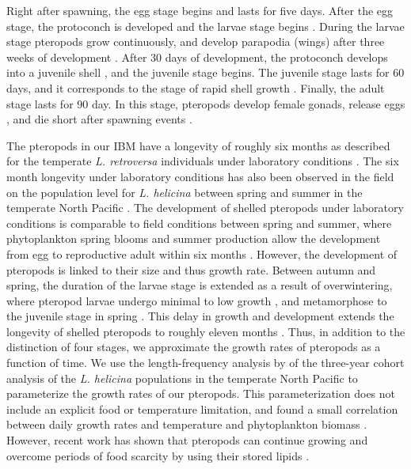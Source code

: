 Right after spawning, the egg stage begins and lasts for five days. After the egg stage, the protoconch is developed and the larvae stage begins \citep{Thabet2015Lifestages}. During the larvae stage pteropods grow continuously, and develop parapodia (wings) after three weeks of development \citep{Thabet2015Lifestages}. After 30 days of development, the protoconch develops into a juvenile shell \citep{Thabet2015Lifestages}, and the juvenile stage begins. The juvenile stage lasts for 60 days, and it corresponds to the stage of rapid shell growth \citep{Thabet2015Lifestages}. Finally, the adult stage lasts for 90 day. In this stage, pteropods develop female gonads, release eggs \cite{lalli1989pelagic,Thabet2015Lifestages,Bednarsek2016CumulativeEffects}, and die short after spawning events \citep{Dadon1992Reproduction,Gannefors2005Overwintering,Hunt2008TopPredators,Howes2014Lab}. 



The pteropods in our IBM have a longevity of roughly six months as described for the temperate \textit{L. retroversa} individuals under laboratory conditions \citep{Thabet2015Lifestages}. The six month longevity under laboratory conditions has also been observed in the field on the population level for \textit{L. helicina} between spring and summer in the temperate North Pacific \citep{Wang2017Lifecycle}. The development of shelled pteropods under laboratory conditions is comparable to field conditions between spring and summer, where phytoplankton spring blooms and summer production allow the development from egg to reproductive adult within six months \citep{Wang2017Lifecycle}. However, the development of pteropods is linked to their size and thus growth rate. Between autumn and spring, the duration of the larvae stage is extended as a result of overwintering, where pteropod larvae undergo minimal to low growth \citep{Wang2017Lifecycle}, and metamorphose to the juvenile stage in spring \citep{Hunt2008TopPredators}. This delay in growth and development extends the longevity of shelled pteropods to roughly eleven months \citep{Wang2017Lifecycle}. Thus, in addition to the distinction of four stages, we approximate the growth rates of pteropods as a function of time. We use the length-frequency analysis by \cite{Wang2017Lifecycle}  of the three-year cohort analysis of the \textit{L. helicina} populations in the temperate North Pacific to parameterize the growth rates of our pteropods. This parameterization does not include an explicit food or temperature limitation, and  found a small correlation between daily growth rates and temperature and phytoplankton biomass \citep{Wang2017Lifecycle}. However, recent work has shown that pteropods can continue growing and overcome periods of food scarcity by using their stored lipids \citep{Maas2020Lipids}. 

